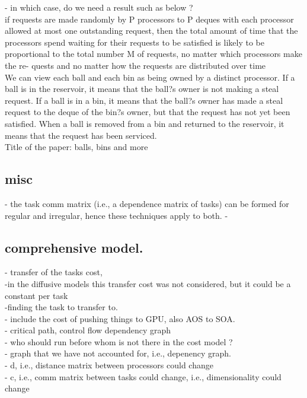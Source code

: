 \documentclass{article}
\begin{document}
- in which case, do we need a result such as below ?\\
if requests are made randomly by P processors to P deques with each processor allowed at most one outstanding request, then the total amount of time that the processors spend waiting for their requests to be satisfied is likely to be proportional to the total number M of requests, no matter which processors make the re- quests and no matter how the requests are distributed over time\\
We can  view each ball and each bin as being owned by a distinct processor. If a ball is in the reservoir, it means that the ball?s owner is not making a steal request. If a ball is in a bin, it means that the ball?s owner has made a steal request to the deque of the bin?s owner, but that the request has not yet been satisfied. When a ball is removed from a bin and returned to the reservoir, it means that the request has been serviced.\\
Title of the paper: balls, bins and more\\


\subsection{misc}
- the task comm matrix (i.e., a dependence matrix of tasks) can be formed for regular and irregular, hence these techniques apply to both. 
- 


\subsection{comprehensive model.}
	- transfer of the tasks cost,\\ 
		-in the diffusive models this transfer cost was not considered, but it could be a constant per task\\
		-finding the task to transfer to.\\
		- include the cost of pushing things to GPU, also AOS to SOA. \\
	- critical path, control flow dependency graph\\
		- who should run before whom is not there in the cost model ?\\
		- graph that we have not accounted for, i.e., depenency graph. \\
	- d, i.e., distance matrix between processors could change\\
	- c, i.e., comm matrix between tasks could change, i.e., dimensionality could change\\
	
\end{document}
